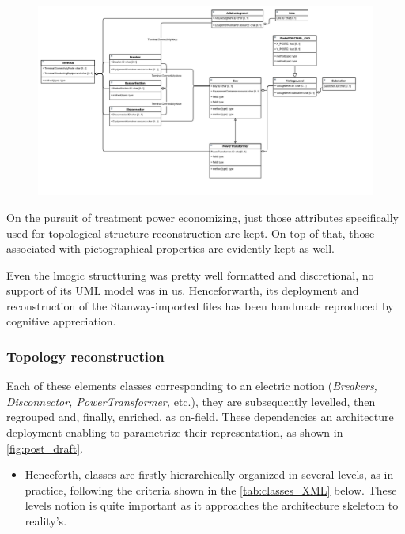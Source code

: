 \begin{figure}[h]
    \centering
    \parbox[t]{1\textwidth}{
    {\centering
    \includegraphics[width=1\textwidth]{0.figuras/Synoptique_UML_classes_RDF_Stanway.png}}
    \label{fig:Classes-synoptical}}
\end{figure}  

On the pursuit of treatment power economizing, just those attributes specifically used for topological structure reconstruction are kept. On top of that, those associated with pictographical properties are evidently kept as well.

Even the lmogic structturing was pretty well formatted and discretional, no support of its UML model was in us. Henceforwarth, its deployment and reconstruction of the Stanway-imported files has been handmade reproduced by cognitive appreciation. 

\subsubsection{Topology reconstruction}
\label{}

Each of these elements classes corresponding to an electric notion (\textit{Breakers, Disconnector, PowerTransformer,} etc.), they are subsequently levelled, then regrouped  and, finally, enriched, as on-field. These dependencies an architecture deployment enabling to parametrize their representation, as shown in \autoref{fig:post_draft}.

\label{subsubsec:AIG:methodology:structurisation:topology}
\begin{itemize}
    \item Henceforth, classes are firstly hierarchically organized in several levels, as in practice, following the criteria shown in the \autoref{tab:classes_XML} below. These levels notion is quite important as it approaches the architecture skeletom to reality's.
\end{itemize}


